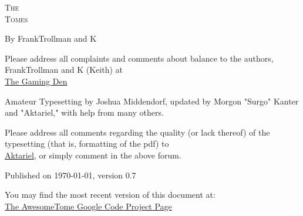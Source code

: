 \pagestyle{plain}

\begin{center} \Huge

\textsc{The\\
Tomes\\
}\end{center}

\vspace{2cm}
\begin{center}\large By FrankTrollman and K\end{center}

\newpage

\vspace*{4in}

\noindent Please address all complaints and comments about balance to the authors, FrankTrollman and K (Keith) at\\
\href{http://tgdmb.com/viewforum.php?f=1}{The Gaming Den}

\vspace{0.2in}



\noindent Amateur Typesetting by Joshua Middendorf, updated by Morgon "Surgo" Kanter and "Aktariel," with help from many others.\\

\vspace{0.2in}

\noindent Please address all comments regarding the quality (or lack thereof) of the typesetting (that is, formatting of the pdf) to\\ 
\href{mailto:aktariel@gmail.com}{Aktariel}, or simply comment in the above forum.\\





\vspace{1in}

\noindent Published on \today, version 0.7\\
\vspace{0.1in}

\noindent You may find the most recent version of this document at:\\
\href{http://code.google.com/p/awesometome/downloads/list}{The AwesomeTome Google Code Project Page}

\newpage
